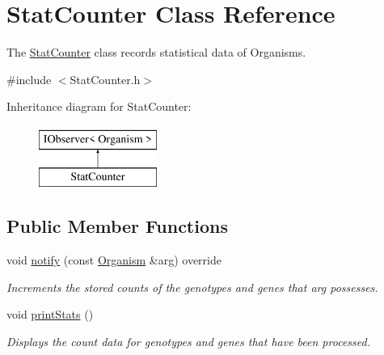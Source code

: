 \hypertarget{class_stat_counter}{}\section{Stat\+Counter Class Reference}
\label{class_stat_counter}


The \hyperlink{class_stat_counter}{Stat\+Counter} class records statistical data of Organisms.  




{\ttfamily \#include $<$Stat\+Counter.\+h$>$}

Inheritance diagram for Stat\+Counter\+:\begin{figure}[H]
\begin{center}
\leavevmode
\includegraphics[height=2.000000cm]{class_stat_counter}
\end{center}
\end{figure}
\subsection*{Public Member Functions}
\begin{DoxyCompactItemize}
\item 
void \hyperlink{class_stat_counter_a81f82e98e35f1571565f2e1bc54de471}{notify} (const \hyperlink{class_organism}{Organism} \&arg) override\hypertarget{class_stat_counter_a81f82e98e35f1571565f2e1bc54de471}{}\label{class_stat_counter_a81f82e98e35f1571565f2e1bc54de471}

\begin{DoxyCompactList}\small\item\em Increments the stored counts of the genotypes and genes that arg possesses. \end{DoxyCompactList}\item 
void \hyperlink{class_stat_counter_ada1a2c28945b0bedd7840068e6cf770f}{print\+Stats} ()\hypertarget{class_stat_counter_ada1a2c28945b0bedd7840068e6cf770f}{}\label{class_stat_counter_ada1a2c28945b0bedd7840068e6cf770f}

\begin{DoxyCompactList}\small\item\em Displays the count data for genotypes and genes that have been processed. \end{DoxyCompactList}\end{DoxyCompactItemize}


